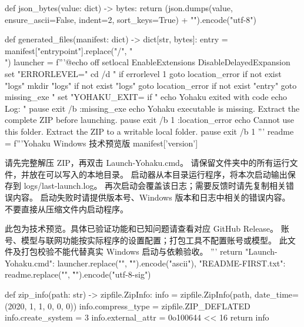 def json_bytes(value: dict) -> bytes:
    return (json.dumps(value, ensure_ascii=False, indent=2, sort_keys=True) + "\n").encode("utf-8")


def generated_files(manifest: dict) -> dict[str, bytes]:
    entry = manifest["entrypoint"].replace("/", "\\")
    launcher = f'''@echo off
setlocal EnableExtensions DisableDelayedExpansion
set "ERRORLEVEL="
cd /d "%
if errorlevel 1 goto location_error
if not exist "logs" mkdir "logs"
if not exist "logs" goto location_error
if not exist "{entry}" goto missing_exe
"%
set "YOHAKU_EXIT=%
if "%
echo Yohaku exited with code %
echo Log: "%
pause
exit /b %
:missing_exe
echo Yohaku executable is missing. Extract the complete ZIP before launching.
pause
exit /b 1
:location_error
echo Cannot use this folder. Extract the ZIP to a writable local folder.
pause
exit /b 1
'''
    readme = f'''Yohaku Windows 技术预览版 {manifest['version']}

请先完整解压 ZIP，再双击 Launch-Yohaku.cmd。
请保留文件夹中的所有运行文件，并放在可以写入的本地目录。
启动器从本目录运行程序，将本次启动输出保存到 logs/last-launch.log。
再次启动会覆盖该日志；需要反馈时请先复制相关错误内容。
启动失败时请提供版本号、Windows 版本和日志中相关的错误内容。
不要直接从压缩文件内启动程序。

此包为技术预览。具体已验证功能和已知问题请查看对应 GitHub Release。
账号、模型与联网功能按实际程序的设置配置；打包工具不配置账号或模型。
此文件及打包校验不能代替真实 Windows 启动与依赖验收。
'''
    return {"Launch-Yohaku.cmd": launcher.replace("\n", "\r\n").encode("ascii"),
            "README-FIRST.txt": readme.replace("\n", "\r\n").encode("utf-8-sig")}


def zip_info(path: str) -> zipfile.ZipInfo:
    info = zipfile.ZipInfo(path, date_time=(2020, 1, 1, 0, 0, 0))
    info.compress_type = zipfile.ZIP_DEFLATED
    info.create_system = 3
    info.external_attr = 0o100644 << 16
    return info



